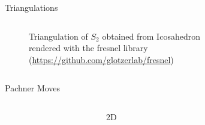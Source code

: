 \begin{frame}{Triangulations}
\begin{columns}
\begin{column}{0.60\textwidth}
\begin{figure}
{     \caption{Triangulation of $S_2$ obtained from Icosahedron\\ \tiny{rendered with the fresnel library (\url{https://github.com/glotzerlab/fresnel})}}}
   \end{figure}
  \end{column}
 \end{columns}
\end{frame}


\begin{frame}{Pachner Moves}
 \begin{columns}[onlytextwidth,t]
  \begin{column}{0.37\textwidth}
  \end{column}
  \begin{column}{0.34\textwidth}
   \begin{block}{2D}
    \vspace{0pt}
    \uncover<2->{}\\
    \vspace{1.0em}
   \end{block}
  \end{column}
  \begin{column}{0.27\textwidth}
  \end{column}
 \end{columns}
\end{frame}

